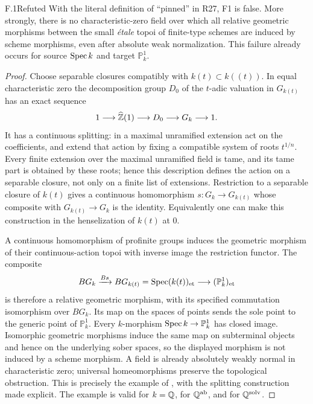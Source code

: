 \begin{claim}{F.1}{Refuted}
With the literal definition of ``pinned'' in R27, F1 is false. More
strongly, there is no characteristic-zero field over which all relative
geometric morphisms between the small \emph{\'etale} topoi of finite-type
schemes are induced by scheme morphisms, even after absolute weak
normalization. This failure already occurs for source $\operatorname{Spec} k$ and
target $\mathbb P^1_k$.
\end{claim}
\begin{proof}
Choose separable closures compatibly with $k(t)\subset k((t))$.
In equal characteristic zero the decomposition group $D_0$ of the
$t$-adic valuation in $G_{k(t)}$ has an exact sequence
\[
1\longrightarrow\widehat{\mathbb Z}(1)\longrightarrow D_0
 \longrightarrow G_k\longrightarrow1.
\]
It has a continuous splitting: in a maximal unramified extension act on
the coefficients, and extend that action by fixing a compatible system
of roots $t^{1/n}$. Every finite extension over the maximal unramified
field is tame, and its tame part is obtained by these roots; hence this
description defines the action on a separable closure, not only on a
finite list of extensions. Restriction to a separable closure of
$k(t)$ gives a continuous homomorphism $s:G_k\to G_{k(t)}$ whose
composite with $G_{k(t)}\to G_k$ is the identity. Equivalently one can
make this construction in the henselization of $k(t)$ at $0$.

A continuous homomorphism of profinite groups induces the geometric
morphism of their continuous-action topoi with inverse image the
restriction functor. The composite
\[
B G_k\xrightarrow{B s} B G_{k(t)}
 =\operatorname{Spec}(k(t))_{\mathrm{et}}
 \longrightarrow (\mathbb P^1_k)_{\mathrm{et}}
\]
is therefore a relative geometric morphism, with its specified
commutation isomorphism over $B G_k$. Its map on the spaces of points
sends the sole point to the generic point of $\mathbb P^1_k$.
Every $k$-morphism $\operatorname{Spec} k\to\mathbb P^1_k$ has closed image.
Isomorphic geometric morphisms induce the same map on subterminal
objects and hence on the underlying sober spaces, so the displayed
morphism is not induced by a scheme morphism. A field is already
absolutely weakly normal in characteristic zero; universal
homeomorphisms preserve the topological obstruction. This is precisely
the example of \citet[Example~2.30]{F_CHW2024}, with the splitting
construction made explicit. The example is valid for $k=\mathbb Q$, for
$\mathbb Q^{\mathrm{ab}}$, and for $\mathbb Q^{\mathrm{solv}}$.
\end{proof}

